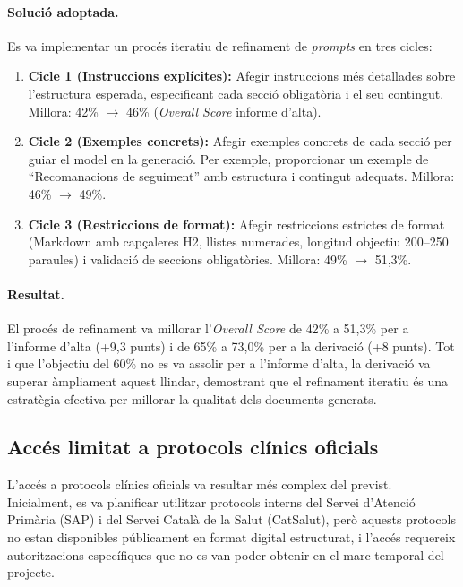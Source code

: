\documentclass[CAT]{TFUOC}%
\begin{document}
\paragraph{Solució adoptada.}
Es va implementar un procés iteratiu de refinament de \textit{prompts} en tres cicles:

\begin{enumerate}
    \item \textbf{Cicle 1 (Instruccions explícites):} Afegir instruccions més detallades sobre l'estructura esperada, especificant cada secció obligatòria i el seu contingut. Millora: 42\% $\rightarrow$ 46\% (\textit{Overall Score} informe d'alta).
    
    \item \textbf{Cicle 2 (Exemples concrets):} Afegir exemples concrets de cada secció per guiar el model en la generació. Per exemple, proporcionar un exemple de ``Recomanacions de seguiment'' amb estructura i contingut adequats. Millora: 46\% $\rightarrow$ 49\%.
    
    \item \textbf{Cicle 3 (Restriccions de format):} Afegir restriccions estrictes de format (Markdown amb capçaleres H2, llistes numerades, longitud objectiu 200--250 paraules) i validació de seccions obligatòries. Millora: 49\% $\rightarrow$ 51,3\%.
\end{enumerate}

\paragraph{Resultat.}
El procés de refinament va millorar l'\textit{Overall Score} de 42\% a 51,3\% per a l'informe d'alta (+9,3 punts) i de 65\% a 73,0\% per a la derivació (+8 punts). Tot i que l'objectiu del 60\% no es va assolir per a l'informe d'alta, la derivació va superar àmpliament aquest llindar, demostrant que el refinament iteratiu és una estratègia efectiva per millorar la qualitat dels documents generats.

\subsection{Accés limitat a protocols clínics oficials}

L'accés a protocols clínics oficials va resultar més complex del previst. Inicialment, es va planificar utilitzar protocols interns del Servei d'Atenció Primària (SAP) i del Servei Català de la Salut (CatSalut), però aquests protocols no estan disponibles públicament en format digital estructurat, i l'accés requereix autoritzacions específiques que no es van poder obtenir en el marc temporal del projecte.
\end{document}
